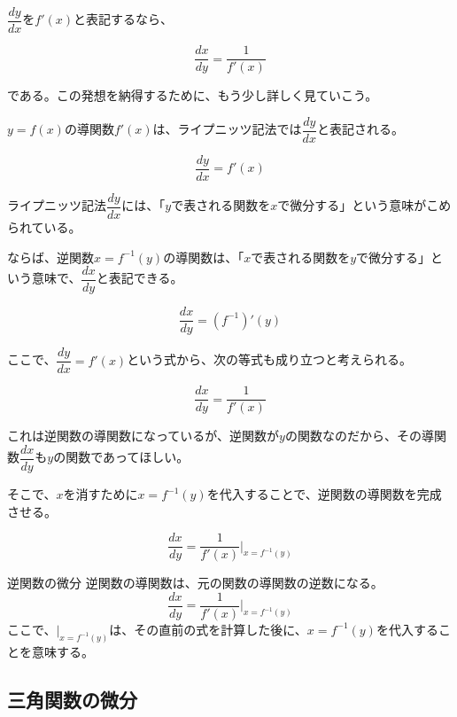 \documentclass[../../imaging-math]{subfiles}
\begin{document}
$\dfrac{dy}{dx}$を$f'(x)$と表記するなら、

\begin{equation}
  \dfrac{dx}{dy} = \dfrac{1}{f'(x)}
\end{equation}

である。この発想を納得するために、もう少し詳しく見ていこう。

\froufrou

$y=f(x)$の導関数$f'(x)$は、ライプニッツ記法では$\dfrac{dy}{dx}$と表記される。

\begin{equation}
  \frac{dy}{dx} = f'(x)
\end{equation}

ライプニッツ記法$\dfrac{dy}{dx}$には、「$y$で表される関数を$x$で微分する」という意味がこめられている。

ならば、逆関数$x = f^{-1}(y)$の導関数は、「$x$で表される関数を$y$で微分する」という意味で、$\dfrac{dx}{dy}$と表記できる。

\begin{equation}
  \frac{dx}{dy} = (f^{-1})'(y)
\end{equation}

ここで、$\dfrac{dy}{dx} = f'(x)$という式から、次の等式も成り立つと考えられる。

\begin{equation}
  \frac{dx}{dy} = \frac{1}{f'(x)}
\end{equation}

これは逆関数の導関数になっているが、逆関数が$y$の関数なのだから、その導関数$\dfrac{dx}{dy}$も$y$の関数であってほしい。

そこで、$x$を消すために$x = f^{-1}(y)$を代入することで、逆関数の導関数を完成させる。

\begin{equation}
  \frac{dx}{dy} = \frac{1}{f'(x)} \Bigg|_{x=f^{-1}(y)}
\end{equation}

\begin{theorem}{逆関数の微分}
  \titlegap
  逆関数の導関数は、元の関数の導関数の逆数になる。
  \LARGE
  \begin{equation}
    \frac{dx}{dy} = \frac{1}{f'(x)} \Bigg|_{x=f^{-1}(y)}
  \end{equation}
  \normalsize
  ここで、$\Bigg|_{x=f^{-1}(y)}$は、その直前の式を計算した後に、$x=f^{-1}(y)$を代入することを意味する。
\end{theorem}

\subsection{三角関数の微分}
\end{document}
